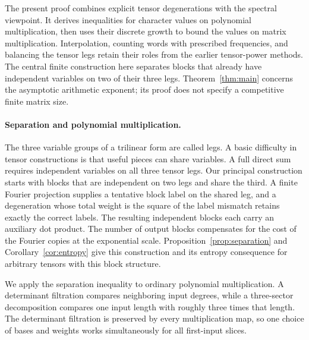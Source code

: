 \documentclass[11pt]{article}
\theoremstyle{definition}
\theoremstyle{remark}
\numberwithin{equation}{section}
\begin{document}
The present proof combines explicit tensor degenerations with the
spectral viewpoint. It derives inequalities for character values on
polynomial multiplication, then uses their discrete growth to bound
the values on matrix multiplication. Interpolation, counting words
with prescribed frequencies, and balancing the tensor legs retain
their roles from the earlier tensor-power methods. The central finite
construction here separates blocks that already have independent
variables on two of their three legs. Theorem~\ref{thm:main} concerns
the asymptotic arithmetic exponent; its proof does not specify a
competitive finite matrix size.

\paragraph{Separation and polynomial multiplication.}
The three variable groups of a trilinear form are called legs. A basic difficulty in tensor constructions is
that useful pieces can share variables. A full direct sum requires
independent variables on all three tensor legs. Our principal construction starts with blocks
that are independent on two legs and share the third. A finite Fourier
projection supplies a tentative block label on the shared leg, and a
degeneration whose total weight is the square of the label mismatch
retains exactly the correct labels.
The resulting independent blocks each carry an auxiliary dot product.
The number of output blocks compensates for the cost of the Fourier
copies at the exponential scale. Proposition~\ref{prop:separation} and
Corollary~\ref{cor:entropy} give this construction and its entropy
consequence for arbitrary tensors with this block structure.

We apply the separation inequality to ordinary polynomial multiplication.
A determinant filtration compares neighboring input degrees, while a
three-sector decomposition compares one input length with roughly three
times that length. The determinant filtration is preserved by every
multiplication map, so one choice of bases and weights works
simultaneously for all first-input slices.
\end{document}
